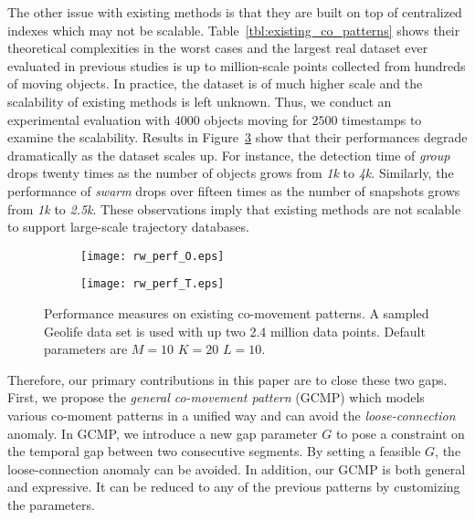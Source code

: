 The other issue with existing methods is that they are built on top of centralized indexes which may not be scalable. Table~\ref{tbl:existing_co_patterns} shows their theoretical complexities in the worst cases and the largest real dataset ever evaluated in previous studies is up to million-scale points collected from hundreds of moving objects. In practice, the dataset is of much higher scale and the scalability of existing methods is left unknown. Thus, we conduct an experimental evaluation with $4000$ objects moving for $2500$ timestamps to examine the scalability. Results in Figure~\ref{fig:related_work_scalability} show that their performances degrade dramatically as the dataset scales up. For instance, the detection time of \emph{group} drops twenty times as the number of objects grows from \emph{1k} to \emph{4k}. Similarly,
the performance of \emph{swarm} drops over fifteen times as the number of snapshots grows from \emph{1k} to \emph{2.5k}.
These observations imply that existing methods are not scalable to support large-scale trajectory databases. 

\begin{figure}[h]
    \centering
    \begin{subfigure}[b]{0.23\textwidth}
            \centering
            \texttt{[image: rw\_perf\_O.eps]}
    \label{fig:fig1}
    \end{subfigure}
    \begin{subfigure}[b]{0.23\textwidth}
            \centering
            \texttt{[image: rw\_perf\_T.eps]}
    \label{fig:fig2}
    \end{subfigure}
    \caption{Performance measures on existing co-movement patterns. A sampled Geolife data set
    is used with up two 2.4 million data points. Default parameters are $M=10$ $K=20$ $L=10$.}
    \label{fig:related_work_scalability}
\end{figure}




Therefore, our primary contributions in this paper are to close these two gaps. 
First, we propose the \emph{general co-movement pattern} (GCMP) which models
various co-moment patterns in a unified way and can avoid 
the \emph{loose-connection} anomaly. In GCMP, we introduce a new gap parameter $G$ to pose a constraint on the temporal gap between two consecutive segments. By setting a feasible $G$, the loose-connection anomaly can be avoided. In addition, our GCMP is both general and expressive. It can be reduced to any of the previous patterns by customizing the parameters.

